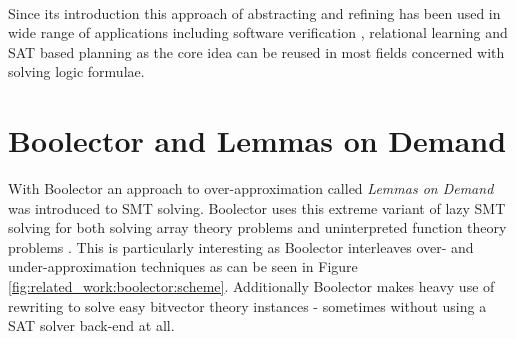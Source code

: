 \paragraph{}
Since its introduction this approach of abstracting and refining has been used in wide range of applications including software verification \cite{CEGAR}, relational learning \cite{CEGAR-Relational-Learning} and SAT based planning \cite{CEGAR-Planning} as the core idea can be reused in most fields concerned with solving logic formulae.



\section{Boolector and Lemmas on Demand}
\label{par:related_work:boolector}
With Boolector \cite{Brummayer-Biere2009_Chapter_BoolectorAnEfficientSMTSolverF} an approach to over-approximation called \textit{Lemmas on Demand} was introduced to SMT solving. Boolector uses this extreme variant of lazy SMT solving for both solving array theory problems \cite{p6-brummayer} and uninterpreted function theory problems \cite{NiemetzPreinerBiere-FMCAD14}.
This is particularly interesting as Boolector interleaves over- and under-approximation techniques as can be seen in Figure \ref{fig:related_work:boolector:scheme}.
Additionally Boolector makes heavy use of rewriting to solve easy bitvector theory instances - sometimes without using a SAT solver back-end at all.
